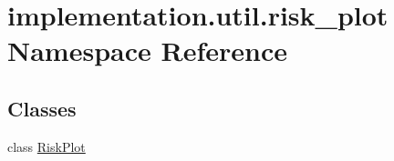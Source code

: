 \hypertarget{namespaceimplementation_1_1util_1_1risk__plot}{}\section{implementation.\+util.\+risk\+\_\+plot Namespace Reference}
\label{namespaceimplementation_1_1util_1_1risk__plot}
\subsection*{Classes}
\begin{DoxyCompactItemize}
\item 
class \hyperlink{classimplementation_1_1util_1_1risk__plot_1_1_risk_plot}{Risk\+Plot}
\end{DoxyCompactItemize}
